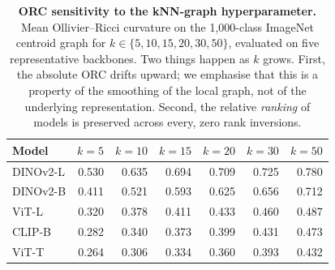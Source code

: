 \begin{table}[!htbp]
\caption{\textbf{ORC sensitivity to the kNN-graph hyperparameter.} Mean Ollivier--Ricci curvature on the 1{,}000-class ImageNet centroid graph for $k \in \{5, 10, 15, 20, 30, 50\}$, evaluated on five representative backbones. Two things happen as $k$ grows. First, the absolute ORC drifts upward; we emphasise that this is a property of the smoothing of the local graph, not of the underlying representation. Second, the relative \emph{ranking} of models is preserved across every, zero rank inversions.}
\label{tab:orc-k}
\centering\small
\begin{tabular}{lrrrrrr}
\toprule
Model & $k=5$ & $k=10$ & $k=15$ & $k=20$ & $k=30$ & $k=50$ \\
\midrule
DINOv2-L & 0.530 & 0.635 & 0.694 & 0.709 & 0.725 & 0.780 \\
DINOv2-B & 0.411 & 0.521 & 0.593 & 0.625 & 0.656 & 0.712 \\
ViT-L    & 0.320 & 0.378 & 0.411 & 0.433 & 0.460 & 0.487 \\
CLIP-B   & 0.282 & 0.340 & 0.373 & 0.399 & 0.431 & 0.473 \\
ViT-T    & 0.264 & 0.306 & 0.334 & 0.360 & 0.393 & 0.432 \\
\bottomrule
\end{tabular}
\end{table}
